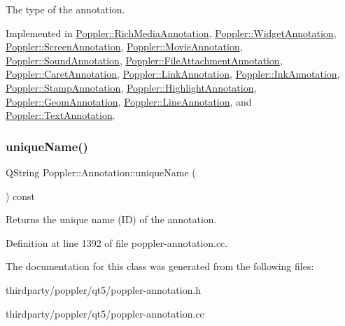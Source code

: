 The type of the annotation. 

Implemented in \hyperlink{class_poppler_1_1_rich_media_annotation_ae853275d25fdd1e415ce28045dbc857f}{Poppler\+::\+Rich\+Media\+Annotation}, \hyperlink{class_poppler_1_1_widget_annotation_a7ddc61e33e4418459f3a266ceea2b5a4}{Poppler\+::\+Widget\+Annotation}, \hyperlink{class_poppler_1_1_screen_annotation_a7a8076dfda640ecf040db9acdd8b3ecf}{Poppler\+::\+Screen\+Annotation}, \hyperlink{class_poppler_1_1_movie_annotation_ab4443ef588d984f52fcb93669da3e88d}{Poppler\+::\+Movie\+Annotation}, \hyperlink{class_poppler_1_1_sound_annotation_af66d5ce084a1ac8ad21a2102942bf909}{Poppler\+::\+Sound\+Annotation}, \hyperlink{class_poppler_1_1_file_attachment_annotation_a7c3d7b8924142ece38d3909af0cf1425}{Poppler\+::\+File\+Attachment\+Annotation}, \hyperlink{class_poppler_1_1_caret_annotation_a08a713ef697a4e318d20a1271d912b89}{Poppler\+::\+Caret\+Annotation}, \hyperlink{class_poppler_1_1_link_annotation_a05dbb8a3128989c44214ab9e3a1335dd}{Poppler\+::\+Link\+Annotation}, \hyperlink{class_poppler_1_1_ink_annotation_a800926980dc58d7b1d805f0ca8bab73f}{Poppler\+::\+Ink\+Annotation}, \hyperlink{class_poppler_1_1_stamp_annotation_ad4140dc18ea7dfc4b844afc1d0abdf74}{Poppler\+::\+Stamp\+Annotation}, \hyperlink{class_poppler_1_1_highlight_annotation_ab71e12c01a8005c2fb4a4db9c218c8da}{Poppler\+::\+Highlight\+Annotation}, \hyperlink{class_poppler_1_1_geom_annotation_a275700b4d5f06381f18ece403a1169d3}{Poppler\+::\+Geom\+Annotation}, \hyperlink{class_poppler_1_1_line_annotation_aa6afc935d75cfdac20653814b0fe40f0}{Poppler\+::\+Line\+Annotation}, and \hyperlink{class_poppler_1_1_text_annotation_aa2c1926b6e06b1527a43f651fea34aaa}{Poppler\+::\+Text\+Annotation}.

\mbox{\label{class_poppler_1_1_annotation_ac23456377d420ace54b1f7eb4d389423}} 
\subsubsection{\texorpdfstring{unique\+Name()}{uniqueName()}}
{\footnotesize\ttfamily Q\+String Poppler\+::\+Annotation\+::unique\+Name (\begin{DoxyParamCaption}{ }\end{DoxyParamCaption}) const}

Returns the unique name (ID) of the annotation. 

Definition at line 1392 of file poppler-\/annotation.\+cc.



The documentation for this class was generated from the following files\+:\begin{DoxyCompactItemize}
\item 
thirdparty/poppler/qt5/poppler-\/annotation.\+h\item 
thirdparty/poppler/qt5/poppler-\/annotation.\+cc\end{DoxyCompactItemize}
